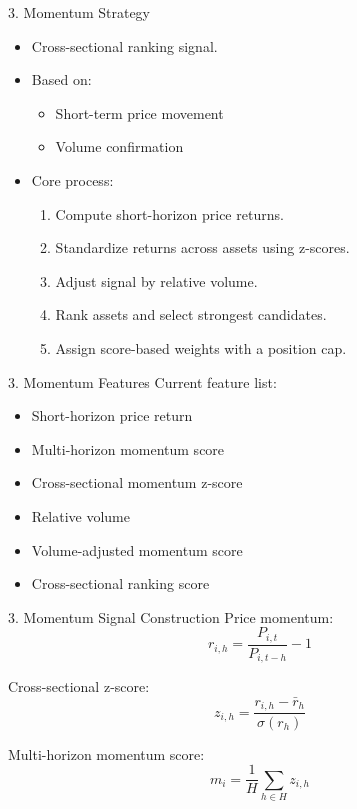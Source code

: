 \documentclass[aspectratio=169]{beamer}
\begin{document}
\begin{frame}{3. Momentum Strategy}
  \begin{itemize}
    \item Cross-sectional ranking signal.
    \item Based on:
    \begin{itemize}
      \item Short-term price movement
      \item Volume confirmation
    \end{itemize}
    \item Core process:
    \begin{enumerate}
      \item Compute short-horizon price returns.
      \item Standardize returns across assets using z-scores.
      \item Adjust signal by relative volume.
      \item Rank assets and select strongest candidates.
      \item Assign score-based weights with a position cap.
    \end{enumerate}
  \end{itemize}
\end{frame}

\begin{frame}{3. Momentum Features}
  Current feature list:

  \vspace{0.2cm}

  \begin{itemize}
    \item Short-horizon price return
    \item Multi-horizon momentum score
    \item Cross-sectional momentum z-score
    \item Relative volume
    \item Volume-adjusted momentum score
    \item Cross-sectional ranking score
  \end{itemize}
\end{frame}

\begin{frame}{3. Momentum Signal Construction}
  Price momentum:
  \[
    r_{i,h}
    =
    \frac{P_{i,t}}{P_{i,t-h}} - 1
  \]

  Cross-sectional z-score:
  \[
    z_{i,h}
    =
    \frac{r_{i,h} - \bar{r}_{h}}{\sigma(r_h)}
  \]

  Multi-horizon momentum score:
  \[
    m_i
    =
    \frac{1}{H}\sum_{h \in H} z_{i,h}
  \]
\end{frame}
\end{document}
